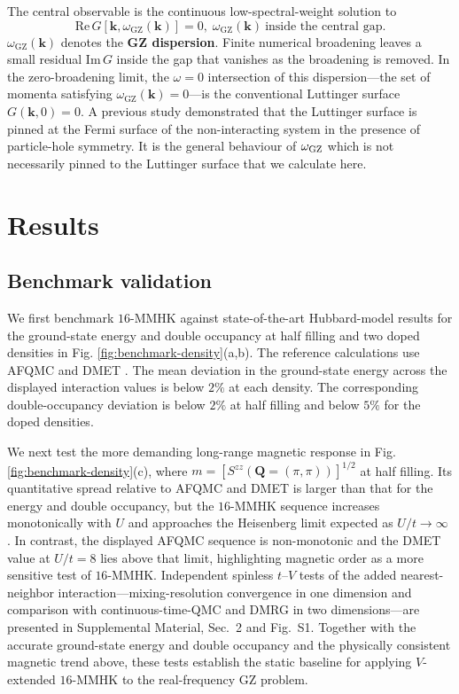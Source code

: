 \documentclass[aps,prl,reprint,superscriptaddress,nofootinbib,longbibliography]{revtex4-1}
\newcommand{\wzero}{\omega_{\mathrm{GZ}}}
\newcommand{\ReG}{\mathrm{Re}\,G}
\newcommand{\ImG}{\mathrm{Im}\,G}
\newcommand{\figdisp}[1]{Fig. \ref{#1}}
\begin{document}
The central observable is the continuous low-spectral-weight solution to
\begin{equation}
  \ReG\!\left[\mathbf{k},\wzero(\mathbf{k})\right]=0,
  \; \wzero(\mathbf{k})\ \text{inside the central gap}.
  \label{eq:zero-definition}
\end{equation}
$\wzero(\mathbf{k})$ denotes the {\bf GZ dispersion}. Finite numerical broadening leaves a small residual $\ImG$ inside the gap that vanishes as the broadening is removed. In the zero-broadening limit, the $\omega=0$ intersection of this dispersion---the set of momenta satisfying $\wzero(\mathbf{k})=0$---is the conventional Luttinger surface $G(\mathbf{k},0)=0$.  A previous study\cite{stanescu2007luttinger} demonstrated that the Luttinger surface is pinned at the Fermi surface of the non-interacting system in the presence of particle-hole symmetry. It is the general behaviour of $\omega_{\rm GZ}$ which is not necessarily pinned to the Luttinger surface that we calculate here.

\section{Results}

\subsection{Benchmark validation}

We first benchmark $16$-MMHK against state-of-the-art Hubbard-model results for the ground-state energy and double occupancy at half filling and two doped densities in \figdisp{fig:benchmark-density}(a,b). The reference calculations use AFQMC and DMET \cite{leblanc2015solutions,zheng2017stripe,qin2016benchmark}. The mean deviation in the ground-state energy across the displayed interaction values is below $2\%$ at each density. The corresponding double-occupancy deviation is below $2\%$ at half filling and below $5\%$ for the doped densities. %

We next test the more demanding long-range magnetic response in \figdisp{fig:benchmark-density}(c), where $m=\left[S^{zz}(\mathbf Q=(\pi,\pi))\right]^{1/2}$ at half filling. Its quantitative spread relative to AFQMC and DMET is larger than that for the energy and double occupancy, but the $16$-MMHK sequence increases monotonically with $U$ and approaches the Heisenberg limit expected as $U/t\to\infty$ \cite{manousakis1991heisenberg,sandvik2026highprecision}. In contrast, the displayed AFQMC sequence is non-monotonic and the DMET value at $U/t=8$ lies above that limit, highlighting magnetic order as a more sensitive test of $16$-MMHK. Independent spinless $t$--$V$ tests of the added nearest-neighbor interaction---mixing-resolution convergence in one dimension and comparison with continuous-time-QMC and DMRG in two dimensions---are presented in Supplemental Material, Sec.~2 and Fig.~S1. Together with the accurate ground-state energy and double occupancy and the physically consistent magnetic trend above, these tests establish the static baseline for applying $V$-extended $16$-MMHK to the real-frequency GZ problem.
\end{document}
